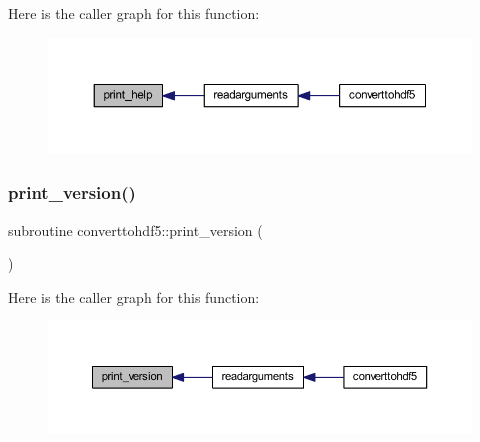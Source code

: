 Here is the caller graph for this function\+:\nopagebreak
\begin{figure}[H]
\begin{center}
\leavevmode
\includegraphics[width=350pt]{_convert_to_h_d_f5_8_f90_a69583c57127dc2e683fb385db8cc755c_icgraph}
\end{center}
\end{figure}
\mbox{\label{_convert_to_h_d_f5_8_f90_ae9f61003f0dd6307a56f6998f03de19b}} 
\subsubsection{\texorpdfstring{print\+\_\+version()}{print\_version()}}
{\footnotesize\ttfamily subroutine converttohdf5\+::print\+\_\+version (\begin{DoxyParamCaption}{ }\end{DoxyParamCaption})}

Here is the caller graph for this function\+:\nopagebreak
\begin{figure}[H]
\begin{center}
\leavevmode
\includegraphics[width=350pt]{_convert_to_h_d_f5_8_f90_ae9f61003f0dd6307a56f6998f03de19b_icgraph}
\end{center}
\end{figure}
\mbox{\label{_convert_to_h_d_f5_8_f90_adf9fee08c1e27d953753809c2a20cbdd}} 
